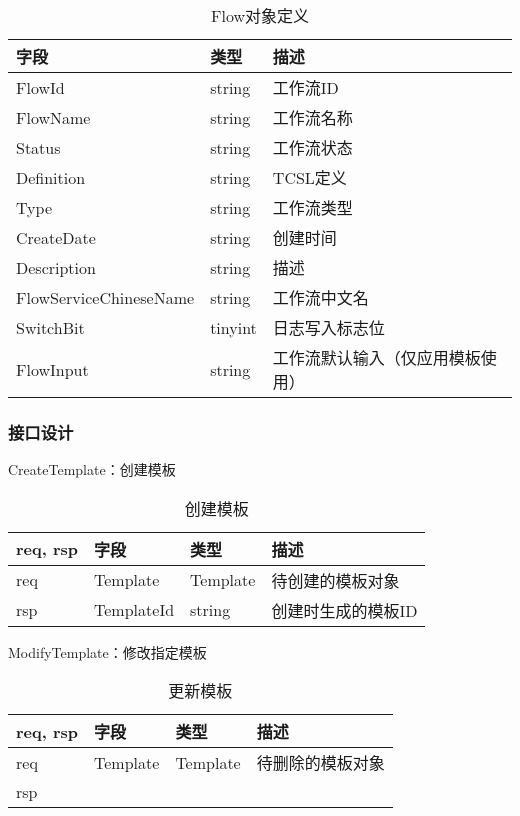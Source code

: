 \begin{table}[H]
    \centering
    \caption{Flow对象定义}
    \label{tab:strcut-template}
    \begin{tabular}{lll}
        \toprule
        字段 & 类型 & 描述 \\
        \midrule
        FlowId &       string & 工作流ID \\
        FlowName &       string & 工作流名称\\
        Status &                string & 工作流状态\\
        Definition &            string & TCSL定义\\
        Type &                  string & 工作流类型\\
        CreateDate &            string & 创建时间\\
        Description &           string & 描述\\
        FlowServiceChineseName & string & 工作流中文名\\
        SwitchBit &             tinyint & 日志写入标志位\\
        FlowInput &             string & 工作流默认输入（仅应用模板使用）\\
        \bottomrule
    \end{tabular}
\end{table}

\subsubsection{接口设计}

CreateTemplate：创建模板

\begin{table}[H]
    \centering
    \caption{创建模板}
    \label{tab:design-interface-template-create}
    \begin{tabular}{llll}
        \toprule
        req, rsp   & 字段 & 类型 & 描述 \\
        \midrule
        req & Template & Template & 待创建的模板对象 \\ \hline
        rsp & TemplateId & string & 创建时生成的模板ID\\
        \bottomrule
    \end{tabular}
\end{table}

ModifyTemplate：修改指定模板

\begin{table}[H]
    \centering
    \caption{更新模板}
    \label{tab:design-interface-template-modify}
    \begin{tabular}{llll}
        \toprule
        req, rsp   & 字段 & 类型 & 描述 \\
        \midrule
        req & Template & Template & 待删除的模板对象 \\ \hline
        rsp & & & \\
        \bottomrule
    \end{tabular}
\end{table}

